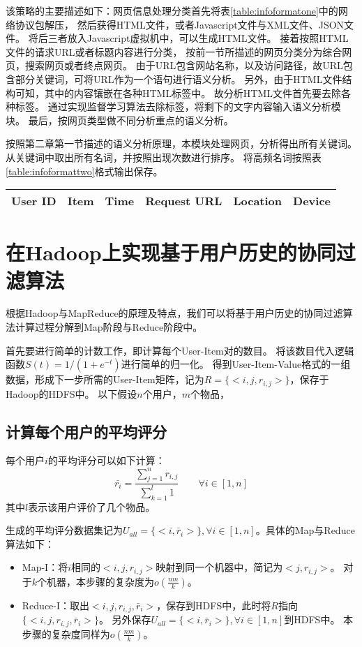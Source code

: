 该策略的主要描述如下：网页信息处理分类首先将表\ref{table:infoformatone}中的网络协议包解压，
然后获得HTML文件，或者Javascript文件与XML文件、JSON文件。
将后三者放入Javascript虚拟机中，可以生成HTML文件。
接着按照HTML文件的请求URL或者标题内容进行分类，
按前一节所描述的网页分类分为综合网页，搜索网页或者终点网页。
由于URL包含网站名称，以及访问路径，故URL包含部分关键词，可将URL作为一个语句进行语义分析。
另外，由于HTML文件结构可知，其中的内容镶嵌在各种HTML标签中。
故分析HTML文件首先要去除各种标签。
通过实现监督学习算法\parencite{Kohlsch2010Boilerplate}去除标签，将剩下的文字内容输入语义分析模块。
最后，按网页类型做不同分析重点的语义分析。

按照第二章第一节描述的语义分析原理，本模块处理网页，分析得出所有关键词。
从关键词中取出所有名词，并按照出现次数进行排序。
将高频名词按照表\ref{table:infoformattwo}格式输出保存。
\begin{center}
\label{table:infoformattwo}
\begin{tabular}{c|c|c|c|c|c}
	\hline
	User ID & Item & Time & Request URL & Location & Device \\
	\hline
\end{tabular}
\end{center}

\section{在Hadoop上实现基于用户历史的协同过滤算法}
根据Hadoop与MapReduce的原理及特点，我们可以将基于用户历史的协同过滤算法计算过程分解到Map阶段与Reduce阶段中。

首先要进行简单的计数工作，即计算每个User-Item对的数目。
将该数目代入逻辑函数$S(t)=1/(1+e^{-t})$进行简单的归一化。
得到User-Item-Value格式的一组数据，形成下一步所需的User-Item矩阵，记为$R=\{<i,j,r_{i,j}>\}$，保存于Hadoop的HDFS中。
以下假设$n$个用户，$m$个物品，

\subsection{计算每个用户的平均评分}
每个用户$i$的平均评分可以如下计算：
\begin{equation}
\bar{r_i} = \frac{\sum_{j=1}^n r_{i,j}}{\sum_{k=1}^l 1}\qquad \forall i\in [1,n]
\end{equation}
其中$l$表示该用户评价了几个物品。

生成的平均评分数据集记为$U_{all}=\{<i,\bar{r}_i>\},\forall i\in [1,n]$。具体的Map与Reduce算法如下：
\begin{itemize}
\item Map-I：将$i$相同的$<i,j,r_{i,j}>$映射到同一个机器中，简记为$<j,r_{i,j}>$。
对于$k$个机器，本步骤的复杂度为$o(\frac{nm}{k})$。
\item Reduce-I：取出$<i,j,r_{i,j},\bar{r}_i>$，保存到HDFS中，此时将$R$指向$\{<i,j,r_{i,j},\bar{r}_i>\}$。
另外保存$U_{all}=\{<i,\bar{r}_i>\},\forall i\in [1,n]$到HDFS中。
本步骤的复杂度同样为$o(\frac{nm}{k})$。
\end{itemize}

